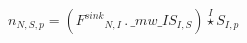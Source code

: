 \documentclass[border=2pt]{standalone}
\begin{document}
${n}{_{N, S, p}}=\left({{F^{sink}}}{_{N, I}} \, . \, {\_mw\_IS}{_{I, S}}\right) \stackrel{I}{\star} {{S}}{_{I, p}}$
\end{document}
